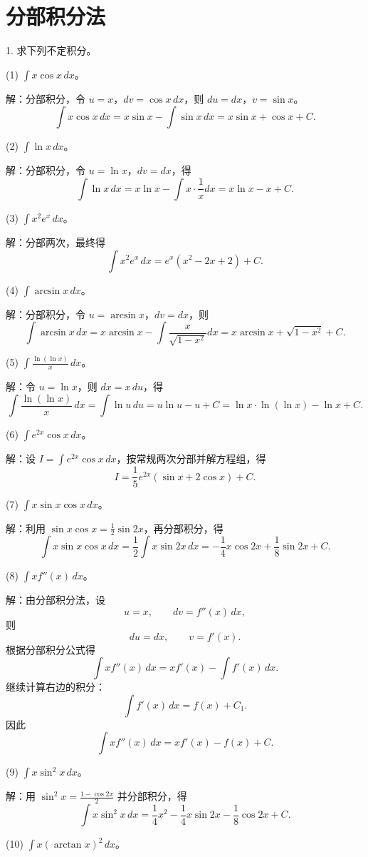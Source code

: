 \section*{分部积分法}

1. 求下列不定积分。

(1) \(\int x\cos x\,dx\)。

解：分部积分，令 \(u=x\)，\(dv=\cos x\,dx\)，则 \(du=dx\)，\(v=\sin x\)。
\[ \int x\cos x\,dx=x\sin x-\int\sin x\,dx=x\sin x+\cos x+C. \]

(2) \(\int\ln x\,dx\)。

解：分部积分，令 \(u=\ln x\)，\(dv=dx\)，得
\[ \int\ln x\,dx=x\ln x-\int x\cdot\frac{1}{x}dx=x\ln x-x+C. \]

(3) \(\int x^{2}e^{x}\,dx\)。

解：分部两次，最终得
\[ \int x^{2}e^{x}\,dx=e^{x}(x^{2}-2x+2)+C. \]

(4) \(\int\arcsin x\,dx\)。

解：分部积分，令 \(u=\arcsin x\)，\(dv=dx\)，则
\[ \int\arcsin x\,dx=x\arcsin x-\int\frac{x}{\sqrt{1-x^{2}}}dx=x\arcsin x+\sqrt{1-x^{2}}+C. \]

(5) \(\int\frac{\ln(\ln x)}{x}\,dx\)。

解：令 \(u=\ln x\)，则 \(dx=x\,du\)，得
\[ \int\frac{\ln(\ln x)}{x}\,dx=\int\ln u\,du=u\ln u-u+C=\ln x\cdot\ln(\ln x)-\ln x+C. \]

(6) \(\int e^{2x}\cos x\,dx\)。

解：设 \(I=\int e^{2x}\cos x\,dx\)，按常规两次分部并解方程组，得
\[ I=\frac{1}{5}e^{2x}(\sin x+2\cos x)+C. \]

(7) \(\int x\sin x\cos x\,dx\)。

解：利用 \(\sin x\cos x=\frac{1}{2}\sin 2x\)，再分部积分，得
\[ \int x\sin x\cos x\,dx=\frac{1}{2}\int x\sin 2x\,dx=-\frac{1}{4}x\cos 2x+\frac{1}{8}\sin 2x+C. \]

(8) \(\int xf''(x)\,dx\)。

解：由分部积分法，设
\[ u=x,\qquad dv=f''(x)\,dx, \]
则
\[ du=dx,\qquad v=f'(x). \]
根据分部积分公式得
\[ \int xf''(x)\,dx=xf'(x)-\int f'(x)\,dx. \]
继续计算右边的积分：
\[ \int f'(x)\,dx=f(x)+C_1. \]
因此
\[ \int xf''(x)\,dx=xf'(x)-f(x)+C. \]

(9) \(\int x\sin^{2}x\,dx\)。

解：用 \(\sin^{2}x=\frac{1-\cos 2x}{2}\) 并分部积分，得
\[ \int x\sin^{2}x\,dx=\frac{1}{4}x^{2}-\frac{1}{4}x\sin 2x-\frac{1}{8}\cos 2x+C. \]

(10) \(\int x(\arctan x)^{2}\,dx\)。

